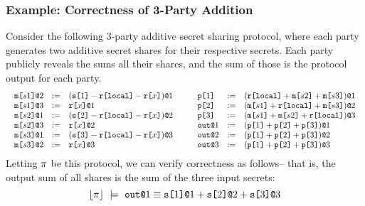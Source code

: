 \subsubsection{Example: Correctness of 3-Party Addition}
Consider the following 3-party additive secret sharing protocol, where
each party generates two additive secret shares
\cite{evans2018pragmatic} for their respective secrets. Each party
publicly reveals the sums all their shares, and the sum of those is
the protocol output for each party.  {\footnotesize
$$
\begin{array}{c@{\qquad}c}
\begin{array}{lll}
  \elab{\mesg{s1}}{2} &:=& \elab{(\secret{1} \fminus \locflip \fminus \flip{x})}{1} \\ 
  \elab{\mesg{s1}}{3} &:=& \elab{\flip{x}}{1} \\ 
  \elab{\mesg{s2}}{1} &:=& \elab{(\secret{2} \fminus \locflip \fminus \flip{x})}{2} \\ 
  \elab{\mesg{s2}}{3} &:=& \elab{\flip{x}}{2} \\ 
  \elab{\mesg{s3}}{1} &:=& \elab{(\secret{3} \fminus \locflip \fminus \flip{x})}{3} \\ 
  \elab{\mesg{s3}}{2} &:=& \elab{\flip{x}}{3}
\end{array} & 
\begin{array}{lll}
  \rvl{1} &:=& \elab{(\locflip \fplus \mesg{s2} \fplus \mesg{s3})}{1} \\ 
  \rvl{2} &:=& \elab{(\mesg{s1} \fplus \locflip \fplus \mesg{s3})}{2} \\
  \rvl{3} &:=& \elab{(\mesg{s1} \fplus \mesg{s2} \fplus \locflip)}{3} \\
  \out{1} &:=& \elab{(\rvl{1} \fplus \rvl{2} + \rvl{3})}{1}\\
  \out{2} &:=& \elab{(\rvl{1} \fplus \rvl{2} + \rvl{3})}{2}\\
  \out{3} &:=& \elab{(\rvl{1} \fplus \rvl{2} + \rvl{3})}{3}
\end{array}
\end{array}
$$}
Letting $\pi$ be this protocol, we can verify correctness
as follows-- that is, the output sum of all shares is the sum of the
three input secrets:
$$
\toeq{\prog}\ \models\ \out{1} \eop \sx{1}{1} \fplus \sx{2}{2} \fplus \sx{3}{3}
$$

